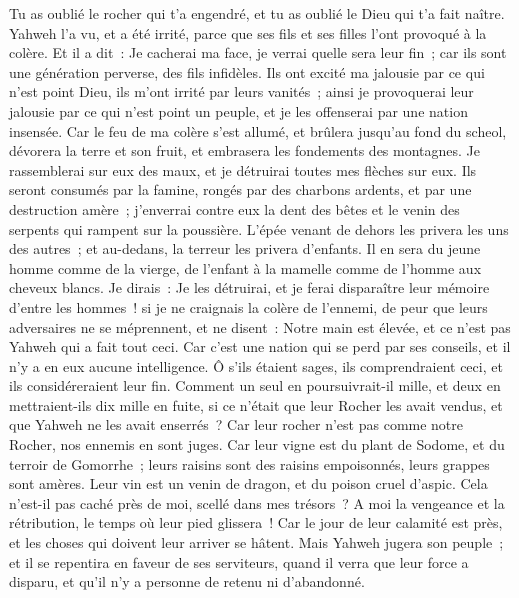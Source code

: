 \begin{multicols}{2}
Tu as oublié le rocher qui t'a engendré, et tu as oublié le Dieu qui t'a fait naître.
Yahweh l'a vu, et a été irrité, parce que ses fils et ses filles l'ont provoqué à la colère.
Et il a dit~: Je cacherai ma face, je verrai quelle sera leur fin~; car ils sont une génération perverse, des fils infidèles.
Ils ont excité ma jalousie par ce qui n'est point Dieu, ils m'ont irrité par leurs vanités~; ainsi je provoquerai leur jalousie par ce qui n'est point un peuple, et je les offenserai par une nation insensée.
Car le feu de ma colère s'est allumé, et brûlera jusqu'au fond du scheol, dévorera la terre et son fruit, et embrasera les fondements des montagnes.
Je rassemblerai sur eux des maux, et je détruirai toutes mes flèches sur eux.
Ils seront consumés par la famine, rongés par des charbons ardents, et par une destruction amère~; j'enverrai contre eux la dent des bêtes et le venin des serpents qui rampent sur la poussière.
L'épée venant de dehors les privera les uns des autres~; et au-dedans, la terreur les privera d'enfants. Il en sera du jeune homme comme de la vierge, de l'enfant à la mamelle comme de l'homme aux cheveux blancs.
Je dirais~: Je les détruirai, et je ferai disparaître leur mémoire d'entre les hommes~!
si je ne craignais la colère de l'ennemi, de peur que leurs adversaires ne se méprennent, et ne disent~: Notre main est élevée, et ce n'est pas Yahweh qui a fait tout ceci.
Car c'est une nation qui se perd par ses conseils, et il n'y a en eux aucune intelligence.
Ô s'ils étaient sages, ils comprendraient ceci, et ils considéreraient leur fin.
Comment un seul en poursuivrait-il mille, et deux en mettraient-ils dix mille en fuite, si ce n'était que leur Rocher les avait vendus, et que Yahweh ne les avait enserrés~?
Car leur rocher n'est pas comme notre Rocher, nos ennemis en sont juges.
Car leur vigne est du plant de Sodome, et du terroir de Gomorrhe~; leurs raisins sont des raisins empoisonnés, leurs grappes sont amères.
Leur vin est un venin de dragon, et du poison cruel d'aspic.
Cela n'est-il pas caché près de moi, scellé dans mes trésors~?
A moi la vengeance et la rétribution, le temps où leur pied glissera~! Car le jour de leur calamité est près, et les choses qui doivent leur arriver se hâtent.
Mais Yahweh jugera son peuple~; et il se repentira en faveur de ses serviteurs, quand il verra que leur force a disparu, et qu'il n'y a personne de retenu ni d'abandonné.

\end{multicols}
